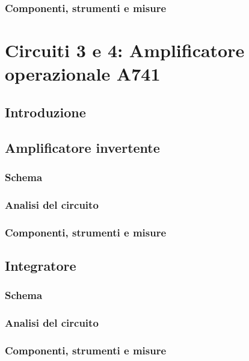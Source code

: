 \documentclass{report}
\begin{document}
\subsection{Componenti, strumenti e misure} 


\clearpage
\newpage
\chapter{Circuiti 3 e 4: Amplificatore operazionale \textmu A741}
\section{Introduzione} 
\section{Amplificatore invertente} 
\subsection{Schema} %
\subsection{Analisi del circuito} 
\subsection{Componenti, strumenti e misure} 
\section{Integratore} 
\subsection{Schema} %
\subsection{Analisi del circuito} 
\subsection{Componenti, strumenti e misure} 





\end{document}

